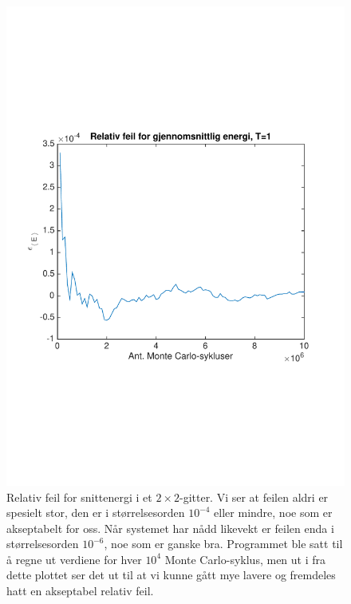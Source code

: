 \documentclass[norsk, 10pt]{article}
\begin{document}
\begin{figure}[H]
\centering
\includegraphics[scale = 0.6, trim = 1cm 8cm 1cm 8cm]{b_rel_err_avgEnergy_L2_T1.pdf}
\caption{Relativ feil for snittenergi i et $2\times2$-gitter. Vi ser at feilen aldri er spesielt stor, den er i størrelsesorden $10^{-4}$ eller mindre, noe som er akseptabelt for oss. Når systemet har nådd likevekt er feilen enda i størrelsesorden $10^{-6}$, noe som er ganske bra. Programmet ble satt til å regne ut verdiene for hver $10^4$ Monte Carlo-syklus, men ut i fra dette plottet ser det ut til at vi kunne gått mye lavere og fremdeles hatt en akseptabel relativ feil.}
\label{fig:errenergyT1L2}
\end{figure}
\end{document}
